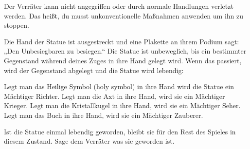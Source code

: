 







Der Verräter kann nicht angegriffen oder durch normale Handlungen verletzt werden. Das heißt, du musst unkonventionelle Maßnahmen anwenden um ihn zu stoppen.


Die Hand der Statue ist ausgestreckt und eine Plakette an ihrem Podium sagt: „Den Unbesiegbaren zu besiegen.“ Die Statue ist unbeweglich, bis ein bestimmter Gegenstand während deines Zuges in ihre Hand gelegt wird. Wenn das passiert, wird der Gegenstand abgelegt und die Statue wird lebendig:

    \begin{itemize}
        \bitem Legt man das Heilige Symbol (holy symbol) in ihre Hand wird die Statue ein Mächtiger Richter.
        \bitem Legt man die Axt in ihre Hand, wird sie ein Mächtiger Krieger.
        \bitem Legt man die Kristallkugel in ihre Hand, wird sie ein Mächtiger Seher.
        \bitem Legt man das Buch in ihre Hand, wird sie ein Mächtiger Zauberer.
    \end{itemize}

\newpage
{}

Ist die Statue einmal lebendig geworden, bleibt sie für den Rest des Spieles in diesem Zustand. Sage dem Verräter was sie geworden ist.

